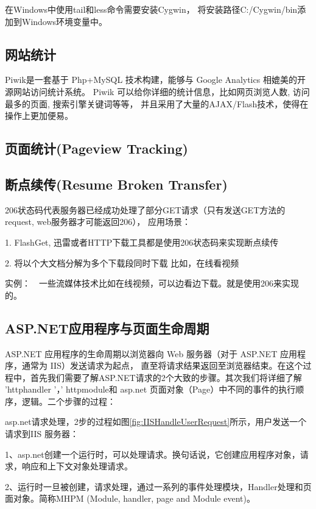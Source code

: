 \documentclass{book}
\begin{document}
在Windows中使用tail和less命令需要安装Cygwin，
将安装路径C:/Cygwin/bin添加到Windows环境变量中。


\subsection{网站统计}

Piwik是一套基于 Php+MySQL 技术构建，能够与 Google Analytics 相媲美的开源网站访问统计系统。
Piwik 可以给你详细的统计信息，比如网页浏览人数, 访问最多的页面, 搜索引擎关键词等等，
并且采用了大量的AJAX/Flash技术，使得在操作上更加便易。

\subsection{页面统计(Pageview Tracking)}

\subsection{断点续传(Resume Broken Transfer)}

206状态码代表服务器已经成功处理了部分GET请求（只有发送GET方法的request, web服务器才可能返回206），
应用场景：

1. FlashGet, 迅雷或者HTTP下载工具都是使用206状态码来实现断点续传

2. 将以个大文档分解为多个下载段同时下载 比如，在线看视频 

实例：　一些流媒体技术比如在线视频，可以边看边下载。就是使用206来实现的。


\subsection{ASP.NET应用程序与页面生命周期}

ASP.NET 应用程序的生命周期以浏览器向 Web 服务器（对于 ASP.NET 应用程序，通常为 IIS）发送请求为起点，
直至将请求结果返回至浏览器结束。在这个过程中，首先我们需要了解ASP.NET请求的2个大致的步骤。其次我们将详细了解 'httphandler '，' httpmodule和 asp.net 页面对象（Page）中不同的事件的执行顺序，逻辑。二个步骤的过程：

asp.net请求处理，2步的过程如图\ref{fig:IISHandleUserRequest}所示，用户发送一个请求到IIS 服务器：

1、asp.net创建一个运行时，可以处理请求。换句话说，它创建应用程序对象，请求，响应和上下文对象处理请求。

2、运行时一旦被创建，请求处理，通过一系列的事件处理模块，Handler处理和页面对象。简称MHPM (Module, handler, page and Module event)。
\end{document}
